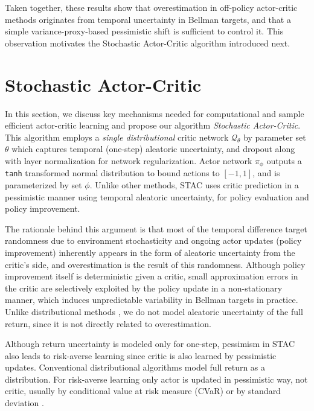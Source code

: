 \documentclass[10pt]{article} %
\begin{document}
Taken together, these results show that overestimation in off-policy actor-critic methods originates from temporal uncertainty in Bellman targets, and that a simple variance-proxy-based pessimistic shift is sufficient to control it. This observation motivates the Stochastic Actor-Critic algorithm introduced next.

\section{Stochastic Actor-Critic}
\label{sec:stac}

In this section, we discuss key mechanisms needed for computational and sample efficient actor-critic learning and propose our algorithm \textit{Stochastic Actor-Critic}. This algorithm employs a \textit{single distributional} critic network $\mathcal{Q}_{\theta}$ by parameter set $\theta$ which captures temporal (one-step) aleatoric uncertainty, and dropout along with layer normalization for network regularization. Actor network $\pi_{\phi}$ outputs a \verb|tanh| transformed normal distribution to bound actions to $[-1, 1]$, and is parameterized by set $\phi$. Unlike other methods, STAC uses critic prediction in a pessimistic manner using temporal aleatoric uncertainty, for policy evaluation and policy improvement. 

The rationale behind this argument is that most of the temporal difference target randomness due to environment stochasticity and ongoing actor updates (policy improvement) inherently appears in the form of aleatoric uncertainty from the critic's side, and overestimation is the result of this randomness. Although policy improvement itself is deterministic given a critic, small approximation errors in the critic are selectively exploited by the policy update in a non-stationary manner, which induces unpredictable variability in Bellman targets in practice. Unlike distributional methods \citep{bellemare2017distributional}, we do not model aleatoric uncertainty of the full return, since it is not directly related to overestimation.

Although return uncertainty is modeled only for one-step, pessimism in STAC also leads to risk-averse learning since critic is also learned by pessimistic updates. Conventional distributional algorithms model full return as a distribution. For risk-averse learning only actor is updated in pessimistic way, not critic, usually by conditional value at risk measure (CVaR) \citep{dabney2018implicit, tang2019worst, yang2021wcsac, kim2022efficient, ma2025dsac} or by standard deviation \citep{ma2025dsac}. 
\end{document}
